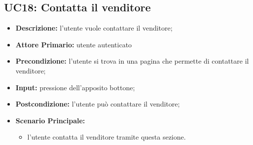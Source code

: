 \subsection{UC18: Contatta il venditore}
\label{sec:UC18}
\begin{itemize}
    \item \textbf{Descrizione:} l'utente vuole contattare il venditore;
    \item \textbf{Attore Primario:} utente autenticato
    \item \textbf{Precondizione:} l'utente si trova in una pagina che permette di contattare il venditore;
    \item \textbf{Input:} pressione dell'apposito bottone;
    \item \textbf{Postcondizione:} l'utente può contattare il venditore;
    \item \textbf{Scenario Principale:}
    \begin{itemize}
        \item l'utente contatta il venditore tramite questa sezione.
    \end{itemize}
\end{itemize}